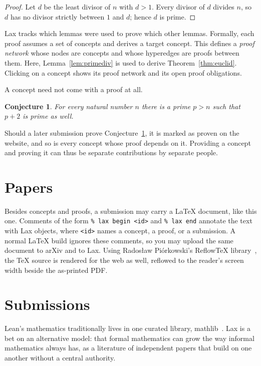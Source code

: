 \documentclass[11pt]{article}
\theoremstyle{plain}
\newtheorem{conjecture}[theorem]{Conjecture}
\theoremstyle{definition}
\newcommand{\laxbadge}[4]{{\setlength{\fboxsep}{1.5pt}\setlength{\fboxrule}{0.4pt}%
  \fcolorbox{#3}{#2}{\textcolor{#1}{\scriptsize\sffamily\bfseries #4}}}}
\newcommand{\laxproven}{\laxbadge{provenfg}{provenbg}{provenborder}{THM\,\checkmark}}
\begin{document}
\begin{proof}
  Let $d$ be the least divisor of $n$ with $d > 1$. Every divisor of $d$
  divides $n$, so $d$ has no divisor strictly between $1$ and $d$; hence $d$
  is prime.
\end{proof}

Lax tracks which lemmas were used to prove which other lemmas.
Formally, each proof assumes a set of concepts and derives a target concept.
This defines a \emph{proof network} whose nodes are concepts and whose
hyperedges are proofs between them. Here, Lemma~\ref{lem:primediv} is used to
derive Theorem~\ref{thm:euclid}. Clicking on a concept shows its proof network
and its open proof obligations.

A concept need not come with a proof at all.

\begin{conjecture}\label{con:twin}
  For every natural number $n$ there is a prime $p > n$ such that $p + 2$ is
  prime as well.
\end{conjecture}

Should a later submission prove Conjecture~\ref{con:twin}, it is marked as
proven \laxproven{} on the website, and so is every concept whose proof
depends on it. Providing a concept and proving it can thus be separate
contributions by separate people.

\section{Papers}

Besides concepts and proofs, a submission may carry a \LaTeX{} document, like
this one. Comments of the form \texttt{\% lax begin <id>} and
\texttt{\% lax end} annotate the text with Lax objects, where
\texttt{<id>} names a concept, a
proof, or a submission. A normal \LaTeX{} build ignores these comments, so
you may upload the same document to arXiv and to Lax. Using Rados\l{}aw
Pi\'orkowski's ReflowTeX library~\cite{reflowtex}, the \TeX{} source is
rendered for the web as well, reflowed to the reader's screen width beside
the as-printed PDF.

\section{Submissions}

Lean's mathematics traditionally lives in one curated library,
mathlib~\cite{mathlib2020}. Lax is a bet on an alternative model: that formal
mathematics can grow the way informal mathematics always has, as a literature
of independent papers that build on one another without a central authority.
\end{document}
